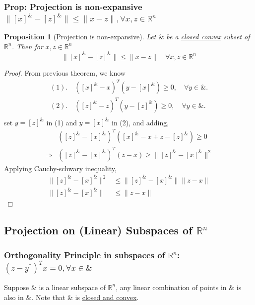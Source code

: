\documentclass[11pt,a4paper]{article}
\newtheorem{proposition}{Proposition}
\begin{document}
\subsubsection{Prop: Projection is non-expansive $\|[x]^\&-[z]^\&\|\leq \|x-z\|,\forall x,z\in \mathbb{R}^n$}
\begin{proposition}
    [Projection is non-expansive]
    Let $\&$ be a \underline{closed convex} subset of $\mathbb{R}^n$. Then for $x,z\in \mathbb{R}^n$
    $$\|[x]^\&-[z]^\&\|\leq \|x-z\|\quad \forall x,z\in \mathbb{R}^n$$
\end{proposition}
\begin{proof}
From previous theorem, we know
\begin{equation}
    \begin{aligned}
        (1).\quad ([x]^\&-x)^T(y-[x]^\&)\geq 0,\quad \forall y\in\&.\\
        (2).\quad ([z]^\&-z)^T(y-[z]^\&)\geq 0,\quad \forall y\in\&.\\
    \end{aligned}
    \nonumber
\end{equation}
set $y=[z]^\&$ in (1) and $y=[x]^\&$ in (2), and adding,
\begin{equation}
    \begin{aligned}
        &([z]^\&-[x]^\&)^T([x]^\&-x+z-[z]^\&)\geq 0\\
        \Rightarrow	& ([z]^\&-[x]^\&)^T(z-x)\geq \|[z]^\&-[x]^\&\|^2
    \end{aligned}
    \nonumber
\end{equation}
Applying Cauchy-schwary inequality,
\begin{equation}
    \begin{aligned}
        \|[z]^\&-[x]^\&\|^2&\leq \|[z]^\&-[x]^\&\|\|z-x\|\\
        \|[z]^\&-[x]^\&\|&\leq \|z-x\|
    \end{aligned}
    \nonumber
\end{equation}
\end{proof}

\subsection{Projection on (Linear) Subspaces of $\mathbb{R}^n$}
\subsubsection{Orthogonality Principle in subspaces of $\mathbb{R}^n$: $(z-y^*)^Tx= 0,\forall x\in\&$}
Suppose $\&$ is a linear subspace of $\mathbb{R}^n$, any linear combination of points in $\&$ is also in $\&$. Note that $\&$ is \underline{closed and convex}.
\end{document}

